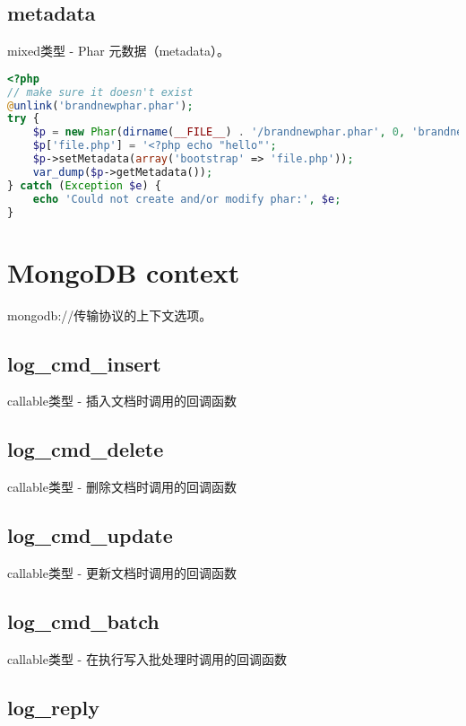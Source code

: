 \subsection{metadata}

mixed类型 - Phar 元数据（metadata）。



\begin{lstlisting}[language=PHP]
<?php
// make sure it doesn't exist
@unlink('brandnewphar.phar');
try {
    $p = new Phar(dirname(__FILE__) . '/brandnewphar.phar', 0, 'brandnewphar.phar');
    $p['file.php'] = '<?php echo "hello"';
    $p->setMetadata(array('bootstrap' => 'file.php'));
    var_dump($p->getMetadata());
} catch (Exception $e) {
    echo 'Could not create and/or modify phar:', $e;
}
\end{lstlisting}





\section{MongoDB context}

mongodb://传输协议的上下文选项。

\subsection{log\_cmd\_insert}

callable类型 - 插入文档时调用的回调函数

\subsection{log\_cmd\_delete}

callable类型 - 删除文档时调用的回调函数

\subsection{log\_cmd\_update}


callable类型 - 更新文档时调用的回调函数

\subsection{log\_cmd\_batch}

callable类型 - 在执行写入批处理时调用的回调函数

\subsection{log\_reply}

